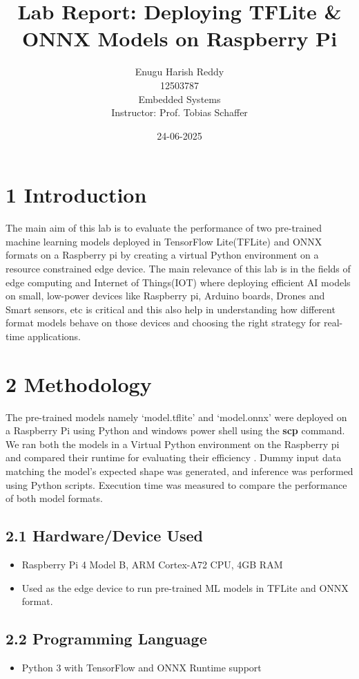 \documentclass[12pt]{article}
\title{Lab Report: Deploying TFLite \& ONNX Models on Raspberry Pi}
\author{Enugu Harish Reddy \\ 12503787 \\ Embedded Systems \\ Instructor: Prof. Tobias Schaffer}
\date{24-06-2025}
\begin{document}
\maketitle

\section*{1 Introduction}
The main aim of this lab is to evaluate the performance of two pre-trained machine learning models deployed in TensorFlow Lite(TFLite) and ONNX formats on a Raspberry pi by creating a virtual Python environment on a resource constrained edge device. The main relevance of this lab is in the fields of edge computing and Internet of Things(IOT) where deploying efficient AI models on small, low-power devices like Raspberry pi, Arduino boards, Drones and Smart sensors, etc is critical and this also help in understanding how different format models behave on those devices and choosing the right strategy for real-time applications.



\section*{2 Methodology}
 The pre-trained models namely ‘model.tflite’ and ‘model.onnx’ were deployed on a Raspberry Pi using Python and windows power shell using the \textbf{scp} command. We ran both the models in a Virtual Python environment on the Raspberry pi and compared their runtime for evaluating their efficiency . Dummy input data matching the model's expected shape was generated, and inference was performed using Python scripts. Execution time was measured to compare the performance of both model formats.


\subsection*{2.1 Hardware/Device Used}
\begin{itemize}
\item Raspberry Pi 4 Model B, ARM Cortex-A72 CPU, 4GB RAM
\item Used as the edge device to run pre-trained ML models in TFLite and ONNX format.
\end{itemize}

\subsection*{2.2 Programming Language}
\begin{itemize}
\item Python 3 with TensorFlow and ONNX Runtime support
\end{itemize}
\end{document}
